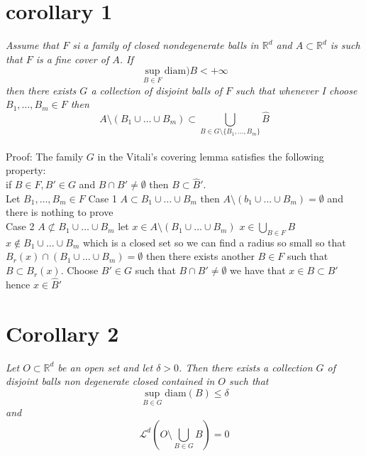 \documentclass[11pt]{article}
\begin{document}
\section{corollary 1}
\emph{
    Assume that $F$ si a family of closed nondegenerate balls in $ \mathbb{R}^{d}$ and $A \subset  \mathbb{R}^{d}$ is such that $F$ is a fine cover
    of  $A$. If 
    \[
        \sup_{B \in F} \text{diam})B < +\infty
    \] 
    then there exists $G$ a collection of disjoint balls of  $F$ such that
    whenever I choose   $B_1, \dots, B_m \in F$ then
    \[
        A \setminus (B_1 \cup \dots \cup B_m) \subset \bigcup_{B \in G \setminus\{B_1,\dots,B_m\}} \hat B
    \] \\
}
Proof: The family $G$ in the Vitali's covering lemma satisfies the following property:\\
if $B \in F, B' \in G$ and  $B \cap B' \ne \emptyset$ then  $B \subset \hat B'$.\\
Let $B_1, \dots, B_m \in F$
Case 1 $A \subset B_1 \cup \dots \cup B_m$ then $A \setminus (b_1 \cup \dots \cup B_m) = \emptyset$ and there is nothing to prove\\
Case 2 $A \not\subset B_1 \cup \dots \cup B_m$ let $x \in A \setminus (B_1 \cup \dots \cup B_m)$ $x \in \bigcup_{B \in F} B$  $x \not\in B_1 \cup \dots \cup B_m$ which is a closed set so we can find a 
radius so small so that $B_r(x) \cap (B_1 \cup \dots \cup B_m) = \emptyset$ then there exists another $B \in F$ such that  $B \subset B_r(x)$. Choose $B' \in G$ such that  $B \cap B' \ne \emptyset$ we have that
 $x \in B \subset \hat B'$ hence $x \in \hat B'$

\section{Corollary 2}
\emph{
    Let $O \subset \mathbb{R}^{d}$ be an open set and let $\delta > 0$. Then there exists
    a collection $G$ of disjoint balls non degenerate closed contained in  $O$ such that
     \[
         \sup_{B \in G} \text{diam}(B) \le \delta
    \] 
    and
    \[
        \mathcal{L}^{d}(O \setminus \bigcup_{B \in G} B) = 0
    \] 
}



 
\end{document}
